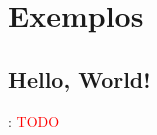 \section{Exemplos}


\subsection{Hello, World!}


\begin{frame}{\insertsection: \insertsubsection}
	\textcolor{red}{TODO}
\end{frame}

